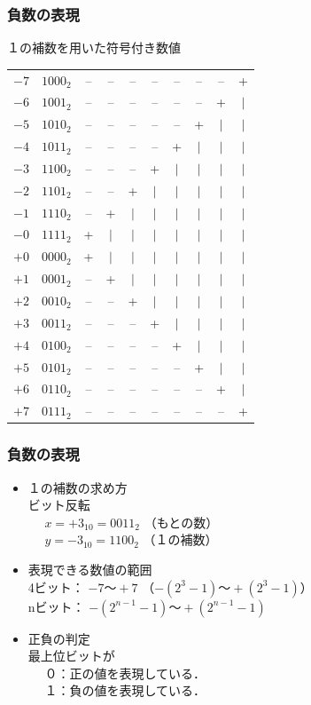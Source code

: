 \documentclass{beamer}                 %
\begin{document}
\newcommand{\h}{$\vert$}
\begin{frame}
  \frametitle{負数の表現}
  \begin{itembox}[l]{１の補数を用いた符号付き数値}
    \small\begin{tabular}{ r r c c c c c c c c }
      $-7$  & $1000_2$ &--&--&--&--&--&--&--& +\\
      $-6$  & $1001_2$ &--&--&--&--&--&--&+ &\h\\
      $-5$  & $1010_2$ &--&--&--&--&--&+ &\h&\h\\
      $-4$  & $1011_2$ &--&--&--&--&+ &\h&\h&\h\\
      $-3$  & $1100_2$ &--&--&--&+ &\h&\h&\h&\h\\
      $-2$  & $1101_2$ &--&--&+ &\h&\h&\h&\h&\h\\
      $-1$  & $1110_2$ &--&+ &\h&\h&\h&\h&\h&\h\\
      $-0$  & $1111_2$ &+ &\h&\h&\h&\h&\h&\h&\h\\
      $+0$  & $0000_2$ &+ &\h&\h&\h&\h&\h&\h&\h\\
      $+1$  & $0001_2$ &--&+ &\h&\h&\h&\h&\h&\h\\
      $+2$  & $0010_2$ &--&--&+ &\h&\h&\h&\h&\h\\
      $+3$  & $0011_2$ &--&--&--&+ &\h&\h&\h&\h\\
      $+4$  & $0100_2$ &--&--&--&--&+ &\h&\h&\h\\
      $+5$  & $0101_2$ &--&--&--&--&--&+ &\h&\h\\
      $+6$  & $0110_2$ &--&--&--&--&--&--&+ &\h\\
      $+7$  & $0111_2$ &--&--&--&--&--&--&--& +\\
    \end{tabular}
  \end{itembox}
\end{frame}

\begin{frame}
  \frametitle{負数の表現}
  \begin{itemize}
  \item １の補数の求め方 \\
    ビット反転\\
    ~~ $x = +3_{10} = 0011_2$ （もとの数）\\
    ~~ $y = -3_{10} = 1100_2$ （１の補数）\\
    \vfill
  \item 表現できる数値の範囲 \\
    4ビット： $-7 〜 +7$ （$-(2^3-1)〜+(2^3-1)$） \\
    nビット： $-(2^{n-1} - 1) 〜 +(2^{n-1} - 1)$
    \vfill
  \item 正負の判定 \\
    最上位ビットが \\
    ~~ ０：正の値を表現している．\\
    ~~ １：負の値を表現している．
  \end{itemize}
\end{frame}
\end{document}
